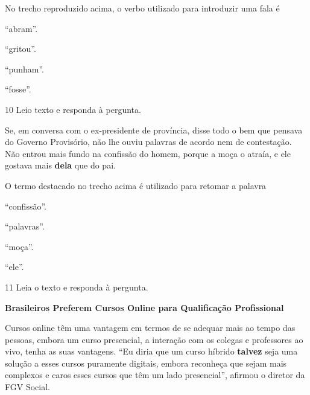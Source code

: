 No trecho reproduzido acima, o verbo utilizado para introduzir uma fala
é

\begin{multicols}{2}
\begin{escolha}
  \item ``abram''.

  \item ``gritou''.

  \item ``punham''.

  \item ``fosse''.
\end{escolha}
\end{multicols}

\num{10} Leio texto e responda à pergunta.

\begin{myquote}
Se, em conversa com o ex-presidente de província, disse todo o bem que
pensava do Governo Provisório, não lhe ouviu palavras de acordo nem de
contestação. Não entrou mais fundo na confissão do homem, porque a moça
o atraía, e ele gostava mais \textbf{dela} que do pai.

\end{myquote}

O termo destacado no trecho acima é utilizado para retomar a palavra

\begin{multicols}{2}
\begin{escolha}
  \item ``confissão''.

  \item ``palavras''.

  \item ``moça''.

  \item ``ele''.
\end{escolha}
\end{multicols}

\num{11} Leia o texto e responda à pergunta.

\begin{myquote}
\textbf{Brasileiros Preferem Cursos Online para Qualificação Profissional}

Cursos online têm uma vantagem em termos de se adequar mais ao tempo das
pessoas, embora um curso presencial, a interação com os colegas e
professores ao vivo, tenha as suas vantagens. ``Eu diria que um curso
híbrido \textbf{talvez} seja uma solução a esses cursos puramente digitais,
embora reconheça que sejam mais complexos e caros esses cursos que têm
um lado presencial'', afirmou o diretor da FGV Social.

\end{myquote}

